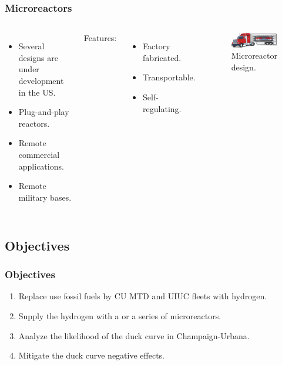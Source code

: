 \begin{frame}
\frametitle{Microreactors}
\begin{columns}
	\column[t]{5cm}
	\begin{itemize}
		\item Several designs are under development in the US.
		\item Plug-and-play reactors.
		\item Remote commercial applications.
		\item Remote military bases.
	\end{itemize}
	\vspace{1cm}
	Features:
	\begin{itemize}
		\item Factory fabricated.
		\item Transportable.
		\item Self-regulating.
	\end{itemize}

    \column[t]{5cm}
	\begin{figure}[htbp!]
		\begin{center}
			\includegraphics[width=5.2cm]{images/microreactor}
		\end{center}
		\caption{Microreactor design.}
	\end{figure}
\end{columns}
\end{frame}

\subsection{Objectives}
\begin{frame}
\frametitle{Objectives}
\centering
    \begin{enumerate}
    	\item Replace use fossil fuels by CU MTD and UIUC fleets with hydrogen.
    	\item Supply the hydrogen with a or a series of microreactors.
    	\item Analyze the likelihood of the duck curve in Champaign-Urbana.
        \item Mitigate the duck curve negative effects.
	\end{enumerate}
\end{frame}